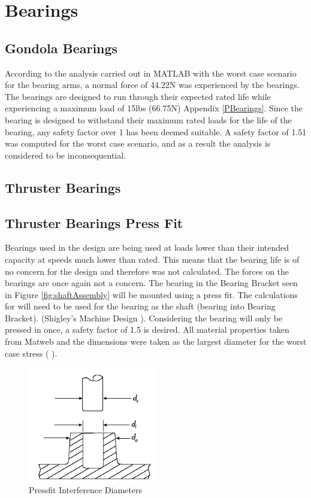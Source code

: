 \documentclass[../main.tex]{subfiles}
\begin{document}
\section{Bearings} \label{Bearings}
\subsection{Gondola Bearings}
According to the analysis carried out in MATLAB with the worst case scenario for the bearing arms, a  normal force of 44.22N was experienced by the bearings. The bearings are designed to run through their expected rated life while experiencing a maximum load of 15lbs (66.75N) Appendix \ref{PBearings}. Since the bearing is designed to withstand their maximum rated loads for the life of the bearing, any safety factor over 1 has been deemed suitable. A safety factor of 1.51 was computed for the worst case scenario, and as a result the analysis is considered to be inconsequential.
\subsection{Thruster Bearings}
\subsection{Thruster Bearings Press Fit}
Bearings used in the design are being used at loads lower than their intended capacity at speeds much lower than rated. This means that the bearing life is of no concern for the design and therefore was not calculated. The forces on the bearings are once again not a concern. The bearing in the Bearing Bracket seen in Figure \ref{fig:shaftAssembly} will be mounted using a press fit. The calculations for will need to be used for the bearing as the shaft (bearing into Bearing Bracket). {(Shigley's Machine Design \cite[116]{shigley})}. Considering the bearing will only be pressed in once, a safety factor of 1.5 is desired. All material properties taken from Matweb and the dimensions were taken as the largest diameter for the worst case stress (\cite{316StainlessSteel} \cite{Aluminum6061} \cite{Nylon6}).

\begin{figure}[H]
	\centering
	\includegraphics[width=0.5\textwidth]{img/analysis/thruster/pressfit.png}
	\caption{Pressfit Interference Diameters \cite{pressfit}}
	\label{fig:pressfit}
\end{figure}
\end{document}
